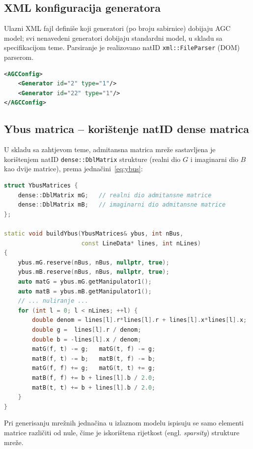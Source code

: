 \documentclass[12pt,oneside, a4paper]{book}
\begin{document}
\subsection{XML konfiguracija generatora}
 
Ulazni XML fajl definiše koji generatori (po broju sabirnice) dobijaju AGC
model; svi nenavedeni generatori dobijaju standardni model, u skladu sa
specifikacijom teme. Parsiranje je realizovano natID
\texttt{xml::FileParser} (DOM) parserom.
 
\begin{lstlisting}[language=XML, style=cppstyle, caption={XML konfiguracija: generatori 2 i 22 dobijaju AGC model, ostali standardni}]
<AGCConfig>
    <Generator id="2" type="1"/>
    <Generator id="22" type="1"/>
</AGCConfig>
\end{lstlisting}
 
\subsection{Ybus matrica -- korištenje natID dense matrica}
 
U skladu sa zahtjevom teme, admitansna matrica mreže sastavljena je
korištenjem natID \texttt{dense::DblMatrix} strukture (realni dio $G$ i
imaginarni dio $B$ kao dvije matrice), prema jednačini~\ref{eq:ybus}:
 
\begin{lstlisting}[language=C++, style=cppstyle, caption={Sastavljanje Ybus matrice korištenjem natID dense::DblMatrix}]
struct YbusMatrices {
    dense::DblMatrix mG;   // realni dio admitansne matrice
    dense::DblMatrix mB;   // imaginarni dio admitansne matrice
};
 
static void buildYbus(YbusMatrices& ybus, int nBus,
                      const LineData* lines, int nLines)
{
    ybus.mG.reserve(nBus, nBus, nullptr, true);
    ybus.mB.reserve(nBus, nBus, nullptr, true);
    auto matG = ybus.mG.getManipulator1();
    auto matB = ybus.mB.getManipulator1();
    // ... nuliranje ...
    for (int l = 0; l < nLines; ++l) {
        double denom = lines[l].r*lines[l].r + lines[l].x*lines[l].x;
        double g =  lines[l].r / denom;
        double b = -lines[l].x / denom;
        matG(f, t) -= g;   matG(t, f) -= g;
        matB(f, t) -= b;   matB(t, f) -= b;
        matG(f, f) += g;   matG(t, t) += g;
        matB(f, f) += b + lines[l].b / 2.0;
        matB(t, t) += b + lines[l].b / 2.0;
    }
}
\end{lstlisting}
 
Pri generisanju mrežnih jednačina u izlaznom modelu ispisuju se samo elementi
matrice različiti od nule, čime je iskorištena rijetkost (engl.
\emph{sparsity}) strukture mreže.
 
\end{document}
